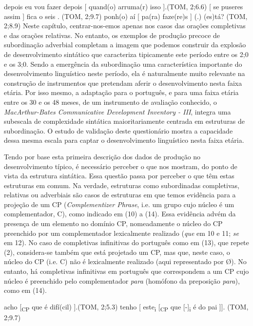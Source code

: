 \documentclass[output=paper,colorlinks,citecolor=brown,booklanguage=portuguese]{langscibook}
\begin{document}
\ea
\label{ex:13:7} depois eu vou fazer depois [ quand(o) arruma(r) isso ].\hfill 	(TOM, 2;6.6)
    \z
\ea
 \label{ex:13:8} [ se puseres assim ] fica o seis .			\hfill	(TOM, 2;9.7)
    \z
\ea
 \label{ex:13:9} ponh(o) aí [ pa(ra) faze(re)s ] (.) (es)tá?	\hfill 	(TOM, 2;8.9)
\z
Neste capítulo, centrar-nos-emos apenas nos casos das orações completivas e das orações relativas. No entanto, os exemplos de produção precoce de subordinação adverbial completam a imagem que podemos construir da explosão de desenvolvimento sintático que caracteriza tipicamente este período entre os 2;0 e os 3;0. Sendo a emergência da subordinação uma característica importante do desenvolvimento linguístico neste período, ela é naturalmente muito relevante na construção de instrumentos que pretendam aferir o desenvolvimento nesta faixa etária. Por isso mesmo, a adaptação para o português, e para uma faixa etária entre os 30 e os 48 meses, de um instrumento de avaliação conhecido, o \emph{MacArthur-Bates Communicative Development Inventory - III}, integra uma subescala de complexidade sintática maioritariamente centrada em estruturas de subordinação. O estudo de validação deste questionário \citep{Cadime2021} mostra a capacidade dessa mesma escala para captar o desenvolvimento linguístico nesta faixa etária.

Tendo por base esta primeira descrição dos dados de produção no desenvolvimento típico, é necessário perceber o que nos mostram, do ponto de vista da estrutura sintática. Essa questão passa por perceber o que têm estas estruturas em comum. Na verdade, estruturas como subordinadas completivas, relativas ou adverbiais são casos de estruturas em que temos evidência para a projeção de um CP (\emph{Complementizer Phrase}, i.e. um grupo cujo núcleo é um complementador, C), como indicado em (10) a (14). Essa evidência advém da presença de um elemento no domínio CP, nomeadamente o núcleo do CP preenchido por um complementador lexicalmente realizado (\emph{que} em 10 e 11; \emph{se} em 12). No caso de completivas infinitivas do português como em (13), que repete (2), considera-se também que está projetado um CP, mas que, neste caso, o núcleo do CP (i.e. C) não é lexicalmente realizado (aqui representado por Ø). No entanto, há completivas infinitivas em português que correspondem a um CP cujo núcleo é preenchido pelo complementador \emph{para} (homófono da preposição \emph{para}), como em (14).

\ea
    \label{ex:13:10} acho [\textsubscript{CP} que é difí(cil) ].\hfill 		(TOM, 2;5.3)
    \z
\ea
\label{ex:13:11} tenho  [ este\textsubscript{i}  [\textsubscript{CP} que [-]\textsubscript{i}  é do pai ]].	\hfill	(TOM, 2;9.7)
\z
\end{document}
